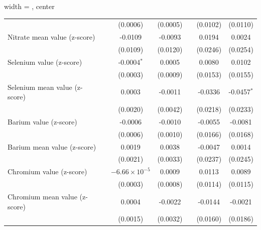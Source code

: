 \begin{table}[htbp]
\begin{adjustbox}{width = \textwidth, center}
\begin{tabular}{lcccccc}
                                                &                & (0.0006)               & (0.0005)        &                 & (0.0102)        & (0.0110)\\   
         Nitrate mean value (z-score)           &                & -0.0109                & -0.0093         &                 & 0.0194          & 0.0024\\   
                                                &                & (0.0109)               & (0.0120)        &                 & (0.0246)        & (0.0254)\\   
         Selenium value (z-score)               &                & -0.0004$^{*}$          & 0.0005          &                 & 0.0080          & 0.0102\\   
                                                &                & (0.0003)               & (0.0009)        &                 & (0.0153)        & (0.0155)\\   
         Selenium mean value (z-score)          &                & 0.0003                 & -0.0011         &                 & -0.0336         & -0.0457$^{*}$\\   
                                                &                & (0.0020)               & (0.0042)        &                 & (0.0218)        & (0.0233)\\   
         Barium value (z-score)                 &                & -0.0006                & -0.0010         &                 & -0.0055         & -0.0081\\   
                                                &                & (0.0006)               & (0.0010)        &                 & (0.0166)        & (0.0168)\\   
         Barium mean value (z-score)            &                & 0.0019                 & 0.0038          &                 & -0.0047         & 0.0014\\   
                                                &                & (0.0021)               & (0.0033)        &                 & (0.0237)        & (0.0245)\\   
         Chromium value (z-score)               &                & $-6.66\times 10^{-5}$  & 0.0009          &                 & 0.0113          & 0.0089\\   
                                                &                & (0.0003)               & (0.0008)        &                 & (0.0114)        & (0.0115)\\   
         Chromium mean value (z-score)          &                & 0.0004                 & -0.0022         &                 & -0.0144         & -0.0021\\   
                                                &                & (0.0015)               & (0.0032)        &                 & (0.0160)        & (0.0186)\\   
         

\end{tabular}
\end{adjustbox}
\end{table}
